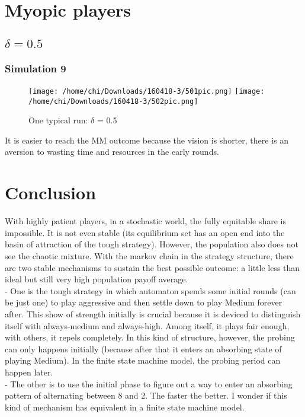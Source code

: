 \documentclass[12.5pt]{report}
\begin{document}
\section{Myopic players}
\subsection{$\delta = 0.5$}
\subsubsection{Simulation 9}

\begin{figure}
\texttt{[image: /home/chi/Downloads/160418-3/501pic.png]}
\texttt{[image: /home/chi/Downloads/160418-3/502pic.png]}

\caption{One typical run: $\delta$ = 0.5}
\end{figure}

It is easier to reach the MM outcome because the vision is shorter, there is an aversion to wasting time and resources in the early rounds.

\section{Conclusion}

With highly patient players, in a stochastic world, the fully equitable share is impossible. It is not even stable (its equilibrium set has an open end into the basin of attraction of the tough strategy). However, the population also does not see the chaotic mixture. With the markov chain in the strategy structure, there are two stable mechanisms to sustain the best possible outcome: a little less than ideal but still very high population payoff average.\\

- One is the tough strategy in which automaton spends some initial rounds (can be just one) to play aggressive and then settle down to play Medium forever after. This show of strength initially is crucial because it is deviced to distinguish itself with always-medium and always-high. Among itself, it plays fair enough, with others, it repels completely. In this kind of structure, however, the probing can only happens initially (because after that it enters an absorbing state of playing Medium). In the finite state machine model, the probing period can happen later.\\

- The other is to use the initial phase to figure out a way to enter an absorbing pattern of alternating between 8 and 2. The faster the better. I wonder if this kind of mechanism has equivalent in a finite state machine model.\\
\end{document}
